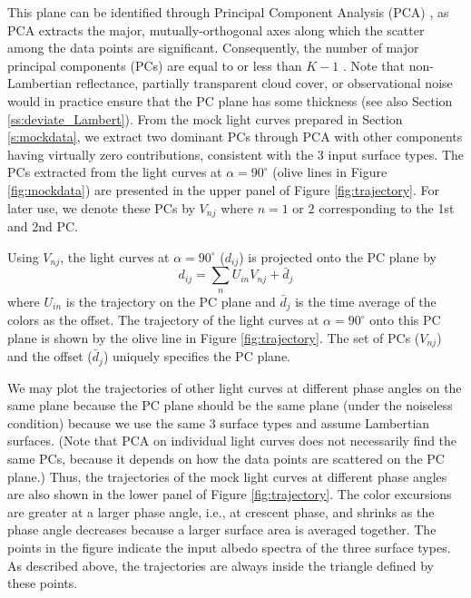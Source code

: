 \documentclass[iop,numberedappendix,apj,]{emulateapj}
\begin{document}
This plane can be identified through Principal Component Analysis (PCA) \citep{Cowan2009,Cowan2011}, as PCA extracts the major, mutually-orthogonal axes along which the scatter among the data points are significant. 
Consequently, the number of major principal components (PCs) are equal to or less than $K-1$ \citep{Cowan2011}. 
{\color{red} Note that non-Lambertian reflectance, partially transparent cloud cover, or observational noise would in practice ensure that the PC plane has some thickness (see also Section \ref{ss:deviate_Lambert}).  }
From the mock light curves prepared in Section \ref{s:mockdata}, we extract two dominant PCs through PCA with other components having virtually zero contributions, consistent with the 3 input surface types.  
The PCs extracted from the light curves at $\alpha = 90^{\circ }$ (olive lines in Figure \ref{fig:mockdata}) are presented in the upper panel of Figure \ref{fig:trajectory}. 
For later use, we denote these PCs by $V_{nj}$ where $n=1$ or $2$  corresponding to the 1st and 2nd PC. 

Using $V_{nj}$, the light curves at $\alpha = 90^{\circ }$ ($d_{ij}$) is projected onto the PC plane by
\begin{equation}
d_{ij} = \sum_n U_{in} V_{nj} + \bar d_j
\end{equation}
where $U_{in}$ is the trajectory on the PC plane and $\bar d_j$ is the time average of the colors as the offset. 
The trajectory of the light curves at $\alpha = 90^{\circ }$ onto this PC plane is shown by the olive line in Figure \ref{fig:trajectory}. 
The set of PCs ($V_{nj}$) and the offset ($\bar d_j$) uniquely specifies the PC plane. 

We may plot the trajectories of other light curves at different phase angles on the same plane because the PC plane should be the same plane (under the noiseless condition) because we use the same 3 surface types and assume Lambertian surfaces. 
(Note that PCA on individual light curves does not necessarily find the same PCs, because it depends on how the data points are scattered on the PC plane.)
Thus, the trajectories of the mock light curves at different phase angles are also shown in the lower panel of Figure \ref{fig:trajectory}. 
The color excursions are greater at a larger phase angle, i.e., at crescent phase, and shrinks as the phase angle decreases because a larger surface area is averaged together.  
The points in the figure indicate the input albedo spectra of the three surface types. 
As described above, the trajectories are always inside the triangle defined by these points. 
\end{document}
